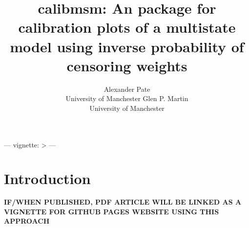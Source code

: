 \documentclass[nojss]{jss}
\author{Alexander Pate\\University of Manchester
  \And Glen P. Martin\\University of Manchester}
\title{calibmsm: An \proglang{R} package for calibration plots of a multistate model using inverse probability of censoring weights}
\begin{document}
---
vignette: >
---

\section[Introduction]{Introduction} \label{sec:intro}

\textbf{IF/WHEN PUBLISHED, PDF ARTICLE WILL BE LINKED AS A VIGNETTE FOR GITHUB PAGES WEBSITE USING THIS APPROACH}
\end{document}
